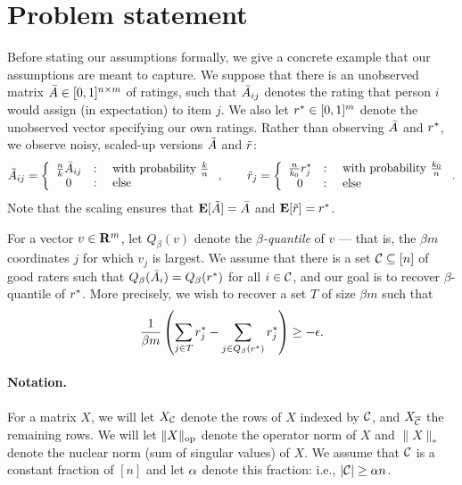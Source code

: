 \section{Problem statement}
\label{sec:assumptions}

Before stating our assumptions formally, we give a concrete example that our 
assumptions are meant to capture. 
We suppose that there is an unobserved matrix $\bar{A} \in [0,1]^{n \times m}$
of ratings, such that $\bar{A}_{ij}$ denotes the rating that person $i$ would 
assign (in expectation) to item $j$. 
We also let $r^* \in [0,1]^m$ denote the unobserved vector 
specifying our own ratings. Rather than observing $\bar{A}$ and $r^*$, 
we observe noisy, scaled-up versions $\tilde{A}$ and $\tilde{r}$:
\begin{equation}
\label{eq:sampling}
\tilde{A}_{ij} = \left\{ \begin{array}{ccl} \frac{n}{k}\bar{A}_{ij} & : & \text{ with probability $\frac{k}{n}$} \\ 0 & : & \text{ else} \end{array} \right., \quad\quad 
  \tilde{r}_j = \left\{ \begin{array}{ccl} \frac{n}{k_0}r^*_j & : & \text{ with probability $\frac{k_0}{n}$} \\ 0 & : & \text{ else} \end{array} \right..
\end{equation} %
Note that the scaling ensures that $\mathbf{E}[\tilde{A}] = \bar{A}$ and $\mathbf{E}[\tilde{r}] = r^*$. 

For a vector $v \in \mathbf{R}^m$, let $Q_{\beta}(v)$ denote the \emph{$\beta$-quantile} 
of $v$ --- that is, the $\beta m$ coordinates $j$ for which $v_j$ is largest.
We assume that there is a set $\mathcal{C} \subseteq [n]$ of good raters such 
that $Q_{\beta}(\bar{A}_{i}) = Q_{\beta}(r^*)$ for all $i \in \mathcal{C}$, and our 
goal is to recover $\beta$-quantile of $r^*$. More precisely, we wish to 
recover a set $T$ of size $\beta m$ such that
\[ \frac{1}{\beta m}\left( \sum_{j \in T} r^*_j - \sum_{j \in Q_{\beta}(r^*)} r^*_j \right) \geq - \epsilon. \]

\paragraph{Notation.}
For a matrix $X$, we will let $X_{\mathcal{C}}$ denote the rows of 
$X$ indexed by $\mathcal{C}$, and $X_{\overline{\mathcal{C}}}$ the remaining rows. 
We will let $\|X\|_{\mathrm{op}}$ denote the operator norm of $X$ and 
$\|X\|_*$ denote the nuclear norm (sum of singular values) of $X$.
We assume that $\mathcal{C}$ is a constant fraction of $[n]$ and let 
$\alpha$ denote this fraction: i.e., $|\mathcal{C}| \geq \alpha n$.

